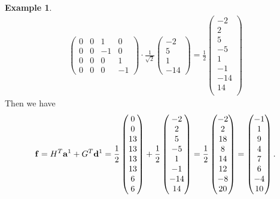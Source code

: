 \documentclass[12pt]{article}
\theoremstyle{definition}
\newtheorem{example}[definition]{Example}
\begin{document}
\begin{example}
\begin{align*}
\begin{pmatrix}
        0 & 0 & 1 & 0\\
        0 & 0 & -1 & 0\\
        0 & 0 & 0 & 1\\
        0 & 0 & 0 & -1
      \end{pmatrix} \cdot \frac{1}{\sqrt{2}}
      \begin{pmatrix}
        -2 \\
        5 \\
        1 \\
        -14
      \end{pmatrix} = \frac{1}{2}
      \begin{pmatrix}
        -2 \\
        2 \\
        5 \\
        -5 \\
        1 \\
        -1 \\
        -14 \\
        14 \\
      \end{pmatrix}
    \end{align*}
    Then we have
    \[\vb{f} = H^T \vb{a}^1 + G^T \vb{d}^1 = \frac{1}{2}
    \begin{pmatrix}
      0 \\ 0 \\ 13 \\ 13 \\ 13 \\ 13 \\ 6 \\ 6
    \end{pmatrix} + \frac{1}{2}
    \begin{pmatrix}
      -2 \\ 2 \\ 5 \\ -5 \\ 1 \\ -1 \\ -14 \\ 14
    \end{pmatrix} = \frac{1}{2}
    \begin{pmatrix}
      -2 \\ 2 \\ 18 \\ 8 \\ 14 \\ 12 \\ -8 \\ 20
    \end{pmatrix} =
    \begin{pmatrix}
      -1 \\ 1 \\ 9 \\ 4 \\ 7 \\ 6 \\ -4 \\ 10
    \end{pmatrix}.\]
  \end{example}
\end{document}
